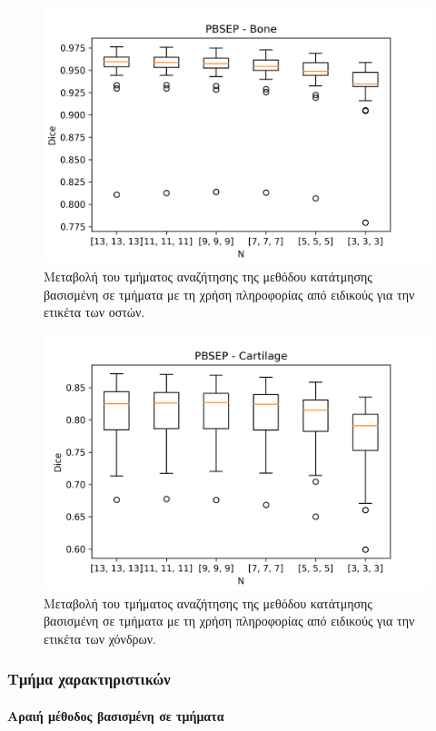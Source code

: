 \documentclass[a4paper,12pt]{article}
\newcommand{\paragraphLine}[1]{\paragraph{#1}\mbox{}\\}
\begin{document}
\begin{figure}[H]
    \centering
    \includegraphics[width=0.85\linewidth]{PBSEP_N_Bone_plot.png}
    \caption{Μεταβολή του τμήματος αναζήτησης της μεθόδου κατάτμησης βασισμένη
             σε τμήματα με τη χρήση πληροφορίας από ειδικούς για την ετικέτα των
             οστών.}
    \label{fig:PBSEP:N:2}
\end{figure}

\begin{figure}[H]
    \centering
    \includegraphics[width=0.85\linewidth]{PBSEP_N_Cartilage_plot.png}
    \caption{Μεταβολή του τμήματος αναζήτησης της μεθόδου κατάτμησης βασισμένη
             σε τμήματα με τη χρήση πληροφορίας από ειδικούς για την ετικέτα των
             χόνδρων.}
    \label{fig:PBSEP:N:3}
\end{figure}


\subsubsection{Τμήμα χαρακτηριστικών}

\paragraphLine{Αραιή μέθοδος βασισμένη σε τμήματα}
\end{document}
